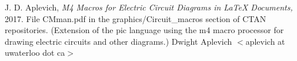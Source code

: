 J. D. Aplevich,
{\it M4 Macros for Electric Circuit Diagrams in LaTeX Documents,}
2017.
File CMman.pdf in the graphics/Circuit\_macros section
of CTAN repositories.
(Extension of the pic
language using the m4 macro processor for drawing electric circuits
and other diagrams.)
%
    Dwight Aplevich $<$aplevich at uwaterloo dot ca$>$
%
%
